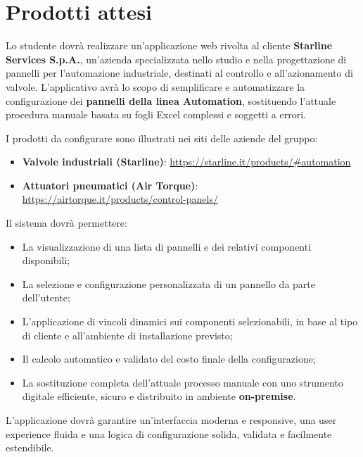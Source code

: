 \section*{Prodotti attesi}

Lo studente dovrà realizzare un'applicazione web rivolta al cliente \textbf{Starline Services S.p.A.}, un’azienda specializzata nello studio e nella progettazione di pannelli per l’automazione industriale, destinati al controllo e all’azionamento di valvole. L'applicativo avrà lo scopo di semplificare e automatizzare la configurazione dei \textbf{pannelli della linea Automation}, sostituendo l'attuale procedura manuale basata su fogli Excel complessi e soggetti a errori.

I prodotti da configurare sono illustrati nei siti delle aziende del gruppo:

\begin{itemize}
    \item \textbf{Valvole industriali (Starline)}: \url{https://starline.it/products/#automation}
    \item \textbf{Attuatori pneumatici (Air Torque)}: \url{https://airtorque.it/products/control-panels/}
\end{itemize}

\medskip

Il sistema dovrà permettere:

\begin{itemize}
    \item La visualizzazione di una lista di pannelli e dei relativi componenti disponibili;
    \item La selezione e configurazione personalizzata di un pannello da parte dell’utente;
    \item L'applicazione di vincoli dinamici sui componenti selezionabili, in base al tipo di cliente e all’ambiente di installazione previsto;
    \item Il calcolo automatico e validato del costo finale della configurazione;
    \item La sostituzione completa dell’attuale processo manuale con uno strumento digitale efficiente, sicuro e distribuito in ambiente \textbf{on-premise}.
\end{itemize}

L’applicazione dovrà garantire un’interfaccia moderna e responsive, una user experience fluida e una logica di configurazione solida, validata e facilmente estendibile.

